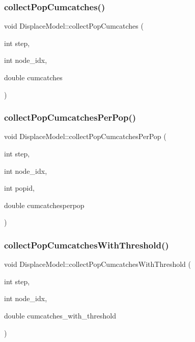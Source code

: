 \mbox{\label{class_displace_model_acfc2e5cfe114d565fe114717c4c252d6}} 
\subsubsection{\texorpdfstring{collectPopCumcatches()}{collectPopCumcatches()}}
{\footnotesize\ttfamily void Displace\+Model\+::collect\+Pop\+Cumcatches (\begin{DoxyParamCaption}\item[{int}]{step,  }\item[{int}]{node\+\_\+idx,  }\item[{double}]{cumcatches }\end{DoxyParamCaption})}

\mbox{\label{class_displace_model_a3d07c4e551890205d769c3cab4b76705}} 
\subsubsection{\texorpdfstring{collectPopCumcatchesPerPop()}{collectPopCumcatchesPerPop()}}
{\footnotesize\ttfamily void Displace\+Model\+::collect\+Pop\+Cumcatches\+Per\+Pop (\begin{DoxyParamCaption}\item[{int}]{step,  }\item[{int}]{node\+\_\+idx,  }\item[{int}]{popid,  }\item[{double}]{cumcatchesperpop }\end{DoxyParamCaption})}

\mbox{\label{class_displace_model_ae1d8a320144b5ce4a77917b710480892}} 
\subsubsection{\texorpdfstring{collectPopCumcatchesWithThreshold()}{collectPopCumcatchesWithThreshold()}}
{\footnotesize\ttfamily void Displace\+Model\+::collect\+Pop\+Cumcatches\+With\+Threshold (\begin{DoxyParamCaption}\item[{int}]{step,  }\item[{int}]{node\+\_\+idx,  }\item[{double}]{cumcatches\+\_\+with\+\_\+threshold }\end{DoxyParamCaption})}


